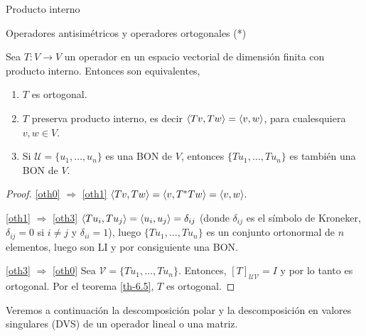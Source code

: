 \begin{chapter}{Producto interno}
\begin{section}{Operadores antisim\'etricos y operadores ortogonales (*)}
        \begin{teorema}\label{th-6.6}
            Sea $T:V \to V$ un operador en un espacio vectorial de dimensión finita con producto interno. Entonces son equivalentes,
            \begin{enumerate}
                \item\label{oth0} $T$  es ortogonal. 
                \item\label{oth1} $T$ preserva producto interno,  es decir $\langle Tv,Tw \rangle = \langle v,w \rangle $, para cualesquiera $v,w \in V$.
                \item\label{oth3} Si $\mathcal U =\{u_1,\ldots,u_n\}$ es una BON de $V$, entonces $\{Tu_1,\ldots,Tu_n\}$ es también una BON de $V$.
            \end{enumerate}
        \end{teorema}
        \begin{proof}
            \ref{oth0} $\Rightarrow$ \ref{oth1}
            $
            \langle Tv,Tw\rangle =	\langle v,T^*Tw\rangle  = \langle v,w \rangle .
            $
            
            
            
            \ref{oth1} $\Rightarrow$ \ref{oth3} $\langle Tu_i,Tu_j\rangle = \langle u_i,u_j\rangle = \delta_{ij}$ (donde $\delta_{ij}$ es el símbolo de Kroneker, $\delta_{ij}=0$ si $i\ne j$ y $\delta_{ii}=1$), luego $\{Tu_1,\ldots,Tu_n\}$ es un conjunto ortonormal  de $n$ elementos, luego son LI y por consiguiente una BON. 
            
            \ref{oth3} $\Rightarrow$ \ref{oth0} Sea $\mathcal V =\{Tu_1,\ldots,Tu_n\}$. Entonces,  $[T]_{\mathcal U \mathcal V}=I$ y por lo tanto es ortogonal. Por el teorema \ref{th-6.5}, $T$  es ortogonal. 
        \end{proof}
        
        Veremos a continuación la descomposición polar y la descomposición en valores singulares (DVS) de un operador lineal o una matriz. 
        

\end{section}
\end{chapter}
